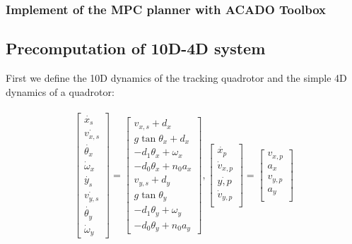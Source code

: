 \subsubsection{Implement of the MPC planner with ACADO Toolbox}
 

\subsection{Precomputation of 10D-4D system}
First we define the 10D dynamics of the tracking quadrotor and the simple 4D dynamics of a quadrotor:


\begin{equation}
\label{eq:Quad8D}
\begin{aligned}
\begin{array}{c}
\left[
\begin{array}{c}
\dot{x_s}\\
\dot{v_{x,s}}\\
\dot{\theta_x}\\
\dot\omega_x\\
\dot{y_s}\\
\dot{v_{y,s}}\\
\dot{\theta_y}\\
\dot\omega_y
\end{array}
\right]
=
\left[
\begin{array}{c}
v_{x,s} + d_x\\
g \tan \theta_x + d_x\\
-d_1 \theta_x + \omega_x\\
-d_0 \theta_x + n_0 a_x\\
v_{y,s} + d_y\\
g \tan \theta_y \\
-d_1 \theta_y + \omega_y\\
-d_0 \theta_y + n_0 a_y
\end{array}
\right],
\left[
\begin{array}{c}
\dot{x_p}\\
\dot v_{x,p}\\
\dot{y,p}\\
\dot v_{y,p}\\
\end{array}
\right] 
=
\left[
\begin{array}{c}
v_{x,p}\\
a_x\\
v_{y,p}\\
a_y\\
\end{array}
\right]
\end{array}\\
\end{aligned}
\end{equation}
